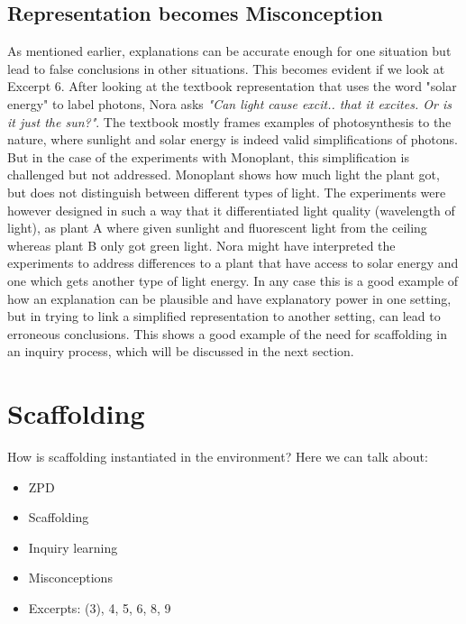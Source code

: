 \subsection{Representation becomes Misconception}
As mentioned earlier, explanations can be accurate enough for one situation but lead to false conclusions in other situations. \citep{smith1994misconceptions} This becomes evident if we look at Excerpt 6. After looking at the textbook representation that uses the word "solar energy" to label photons, Nora asks \emph{"Can light cause excit.. that it excites. Or is it just the sun?"}. The textbook mostly frames examples of photosynthesis to the nature, where sunlight and solar energy is indeed valid simplifications of photons. But in the case of the experiments with Monoplant, this simplification is challenged but not addressed. Monoplant shows how much light the plant got, but does not distinguish between different types of light. The experiments were however designed in such a way that it differentiated light quality (wavelength of light), as plant A where given sunlight and fluorescent light from the ceiling whereas plant B only got green light. Nora might have interpreted the experiments to address differences to a plant that have access to solar energy and one which gets another type of light energy. In any case this is a good example of how an explanation can be plausible and have explanatory power in one setting, but in trying to link a simplified representation to another  setting, can lead to erroneous conclusions. This shows a good example of the need for scaffolding in an inquiry process, which will be discussed in the next section.



\section{Scaffolding}
How is scaffolding instantiated in the environment?
Here we can talk about: 
\begin{itemize}
\item{ZPD}
\item{Scaffolding}
\item{Inquiry learning}
\item{Misconceptions}
\item{Excerpts: (3), 4, 5, 6, 8, 9}
\end{itemize}

